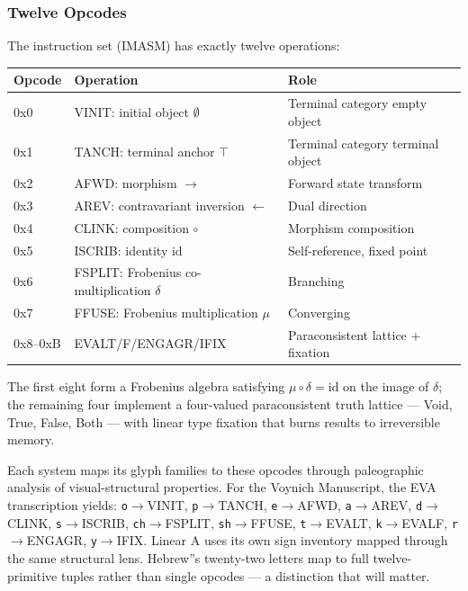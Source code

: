 \documentclass[12pt,a4paper]{article}
\begin{document}
\subsubsection{Twelve Opcodes}

The instruction set (IMASM) has exactly twelve operations:

\begin{table}[htbp]
\centering
\small
{}
\begin{tabularx}{\textwidth}{>{\centering\arraybackslash}X >{\centering\arraybackslash}X >{\centering\arraybackslash}X}
\toprule
\rowcolor{gray!25}\textbf{Opcode} & \textbf{Operation} & \textbf{Role} \\
\midrule
\rowcolors{1}{white}{gray!10}
0x0 & VINIT: initial object $\emptyset$ & Terminal category empty object \\
0x1 & TANCH: terminal anchor $\top$ & Terminal category terminal object \\
0x2 & AFWD: morphism $\rightarrow$ & Forward state transform \\
0x3 & AREV: contravariant inversion $\leftarrow$ & Dual direction \\
0x4 & CLINK: composition $\circ$ & Morphism composition \\
0x5 & ISCRIB: identity $\text{id}$ & Self-reference, fixed point \\
0x6 & FSPLIT: Frobenius co-multiplication $\delta$ & Branching \\
0x7 & FFUSE: Frobenius multiplication $\mu$ & Converging \\
0x8--0xB & EVALT/F/ENGAGR/IFIX & Paraconsistent lattice + fixation \\
\bottomrule
\end{tabularx}
\end{table}

The first eight form a Frobenius algebra satisfying $\mu \circ \delta = \text{id}$ on the image of $\delta$; the remaining four implement a four-valued paraconsistent truth lattice --- Void, True, False, Both --- with linear type fixation that burns results to irreversible memory.

Each system maps its glyph families to these opcodes through paleographic analysis of visual-structural properties. For the Voynich Manuscript, the EVA transcription yields: \texttt{o}$\rightarrow$VINIT, \texttt{p}$\rightarrow$TANCH, \texttt{e}$\rightarrow$AFWD, \texttt{a}$\rightarrow$AREV, \texttt{d}$\rightarrow$CLINK, \texttt{s}$\rightarrow$ISCRIB, \texttt{ch}$\rightarrow$FSPLIT, \texttt{sh}$\rightarrow$FFUSE, \texttt{t}$\rightarrow$EVALT, \texttt{k}$\rightarrow$EVALF, \texttt{r}$\rightarrow$ENGAGR, \texttt{y}$\rightarrow$IFIX. Linear A uses its own sign inventory mapped through the same structural lens. Hebrew''s twenty-two letters map to full twelve-primitive tuples rather than single opcodes --- a distinction that will matter.
\end{document}
